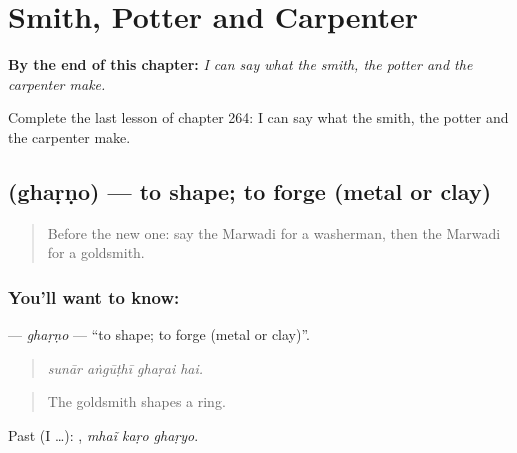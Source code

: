 
\chapter{Smith, Potter and Carpenter}
\label{ch:mw-smith-potter-and-carpenter}

\begin{chapteropening}
\textbf{By the end of this chapter:} \emph{I can say what the smith, the potter and the carpenter make.}

Complete the last lesson of chapter 264: I can say what the smith, the potter and the carpenter make.
\end{chapteropening}

\section[\texorpdfstring{\mw{घड़णो} (ghaṛṇo)}{घड़णो (ghaṛṇo)}]{ (ghaṛṇo) — to shape; to forge (metal or clay)}

\label{lesson:MW-C264-gharno}



\begin{quote}
Before the new one: say the Marwadi for a washerman, then the Marwadi for a goldsmith.
\end{quote}

\subsection*{You'll want to know: }
\textbf{} — \emph{ghaṛṇo} — \textquotedblleft{}to shape; to forge (metal or clay)\textquotedblright{}.

\begin{quote}
   
\end{quote}

\begin{quote}
\emph{sunār aṅgūṭhī ghaṛai hai.}
\end{quote}

\begin{quote}
The goldsmith shapes a ring.
\end{quote}

Past (I …):   , \emph{mhaĩ kaṛo ghaṛyo}.

